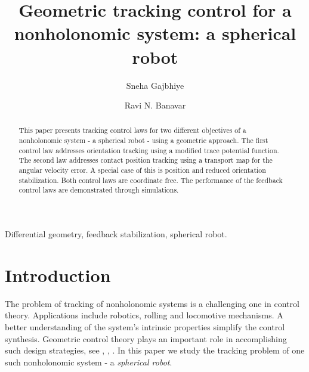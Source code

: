 \documentclass{ifacconf}
\begin{document}
\begin{frontmatter}

\title{Geometric tracking control for a nonholonomic system: a spherical robot} 




\author[First]{Sneha Gajbhiye} 
\author[First]{Ravi N. Banavar} 


\address[First]{Systems and Control Engineering, Indian Institute of Technology Bombay,
India, 400076. (e-mail: sneha@sc.iitb.ac.in, banavar@iitb.ac.in)}


\begin{abstract}  This paper presents tracking control laws for two different objectives of a nonholonomic system - a spherical robot - using a geometric approach. The first control law addresses orientation tracking using a modified trace potential function. The second law addresses contact position tracking using a  transport map for the angular velocity error. A special case of this is position and reduced orientation stabilization. Both control laws are coordinate free. The performance of the feedback control laws are demonstrated through simulations.

\end{abstract}

\begin{keyword}
Differential geometry, feedback stabilization, spherical robot.
\end{keyword}

\end{frontmatter}


\section{Introduction}
The problem of tracking of nonholonomic systems is a challenging one in control theory. Applications include robotics, rolling and locomotive mechanisms. A better understanding of  the system's intrinsic properties simplify the control synthesis. Geometric control theory plays an important role in accomplishing such design strategies, see \citep{book_isidori}, \citep{Zenkov}, \citep{ostrowski_thesis}. In this paper we study the tracking problem of one such nonholonomic system - a \textit{spherical robot}.
\end{document}
